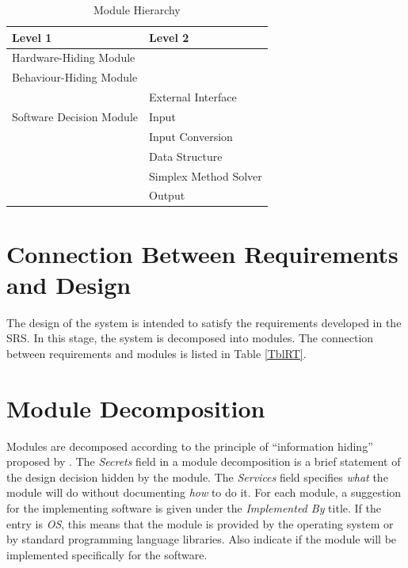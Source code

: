 \documentclass[12pt, titlepage]{article}
\begin{document}
\begin{table}[h!]
\centering
\begin{tabular}{p{} p{}}
\toprule
\textbf{Level 1} & \textbf{Level 2}\\
\midrule

{Hardware-Hiding Module} & ~ \\
\midrule

{Behaviour-Hiding Module} & ~ \\
\midrule

\multirow{3}{0.3\textwidth}{Software Decision Module}
& External Interface\\
& Input\\ 
& Input Conversion\\
& Data Structure\\
& Simplex Method Solver\\
& Output\\
\bottomrule

\end{tabular}
\caption{Module Hierarchy}
\label{TblMH}
\end{table}

\section{Connection Between Requirements and Design} \label{SecConnection}

The design of the system is intended to satisfy the requirements developed in
the SRS. In this stage, the system is decomposed into modules. The connection
between requirements and modules is listed in Table \ref{TblRT}.

\section{Module Decomposition} \label{SecMD}

Modules are decomposed according to the principle of ``information hiding''
proposed by \citet{ParnasEtAl1984}. The \emph{Secrets} field in a module
decomposition is a brief statement of the design decision hidden by the
module. The \emph{Services} field specifies \emph{what} the module will do
without documenting \emph{how} to do it. For each module, a suggestion for the
implementing software is given under the \emph{Implemented By} title. If the
entry is \emph{OS}, this means that the module is provided by the operating
system or by standard programming language libraries.  Also indicate if the
module will be implemented specifically for the software.
\end{document}
